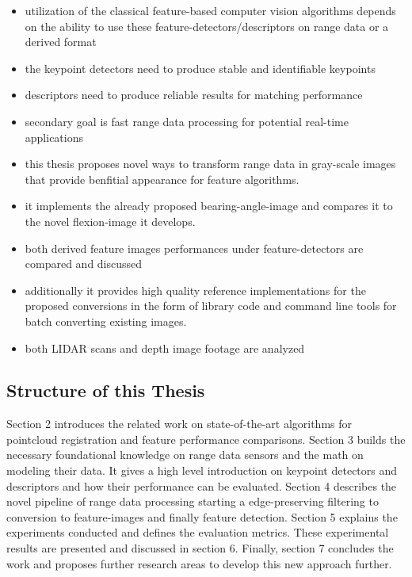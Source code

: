 \begin{itemize}
    \item utilization of the classical feature-based computer vision algorithms depends on the ability to use these feature-detectors/descriptors on range data or a derived format
    \item the keypoint detectors need to produce stable and identifiable keypoints
    \item descriptors need to produce reliable results for matching performance
    \item secondary goal is fast range data processing for potential real-time applications
    \item this thesis proposes novel ways to transform range data in gray-scale images that provide benfitial appearance for feature algorithms.
    \item it implements the already proposed \gls{bearing-angle-image} and compares it to the novel \gls{flexion-image} it develops.
    \item both derived feature images performances under feature-detectors are compared and discussed
    \item additionally it provides high quality reference implementations for the proposed conversions in the form of library code and command line tools for batch converting existing images.
    \item both \gls{LIDAR} scans and depth image footage are analyzed
\end{itemize}

\subsection{Structure of this Thesis}

Section 2 introduces the related work on state-of-the-art algorithms for pointcloud registration and feature performance comparisons.
Section 3 builds the necessary foundational knowledge on range data sensors and the math on modeling their data.
It gives a high level introduction on keypoint detectors and descriptors and how their performance can be evaluated.
Section 4 describes the novel pipeline of range data processing starting a edge-preserving filtering to conversion to feature-images and finally feature detection.
Section 5 explains the experiments conducted and defines the evaluation metrics.
These experimental results are presented and discussed in section 6.
Finally, section 7 concludes the work and proposes further research areas to develop this new approach further.
